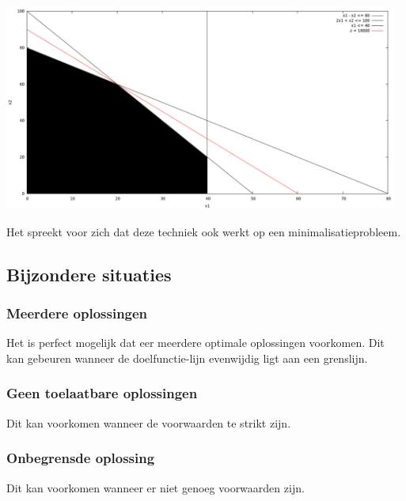 \documentclass[10pt]{article}
\begin{document}
\begin{center}
\includegraphics[width = 130mm]{geometrie2.png}
\end{center}
Het spreekt voor zich dat deze techniek ook werkt op een minimalisatieprobleem.
\subsection{Bijzondere situaties}
\subsubsection{Meerdere oplossingen}
Het is perfect mogelijk dat eer meerdere optimale oplossingen voorkomen. Dit kan gebeuren wanneer de doelfunctie-lijn evenwijdig ligt aan een grenslijn.
\subsubsection{Geen toelaatbare oplossingen}
Dit kan voorkomen wanneer de voorwaarden te strikt zijn.
\subsubsection{Onbegrensde oplossing}
Dit kan voorkomen wanneer er niet genoeg voorwaarden zijn.
\end{document}
